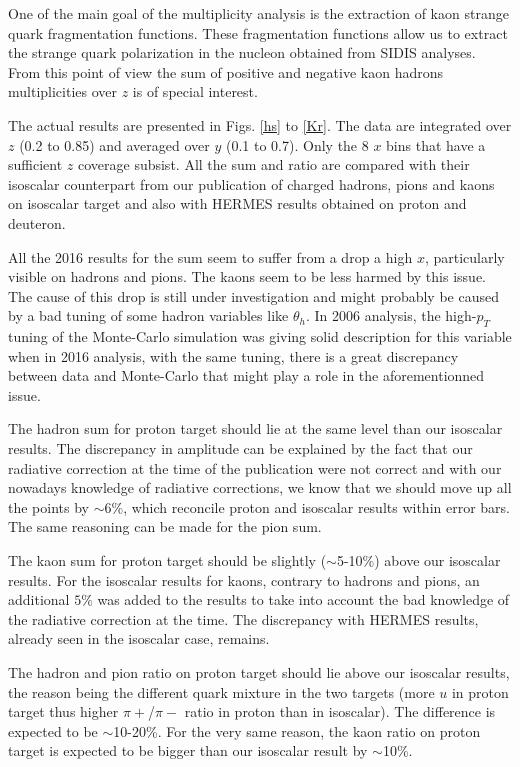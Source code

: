 \documentclass[letterpaper,12pt]{article}
\begin{document}
One of the main goal of the multiplicity analysis is the extraction of kaon strange quark fragmentation functions. These fragmentation functions allow us to extract the strange quark polarization in the nucleon obtained from SIDIS analyses. From this point of view the sum of positive and negative kaon hadrons multiplicities over $z$ is of special interest.

The actual results are presented in Figs. \ref{hs} to \ref{Kr}. The data are integrated over $z$ (0.2 to 0.85) and averaged over $y$ (0.1 to 0.7). Only the 8 $x$ bins that have a sufficient $z$ coverage subsist.
All the sum and ratio are compared with their isoscalar counterpart from our publication of charged hadrons, pions and kaons on isoscalar target and also with HERMES results obtained on proton and deuteron.

All the 2016 results for the sum seem to suffer from a drop a high $x$, particularly visible on hadrons and pions. The kaons seem to be less harmed by this issue. The cause of this drop is still under investigation and might probably be caused by a bad tuning of some hadron variables like $\theta_h$. In 2006 analysis, the high-$p_T$ tuning of the Monte-Carlo simulation was giving solid description for this variable when in 2016 analysis, with the same tuning, there is a great discrepancy between data and Monte-Carlo that might play a role in the aforementionned issue.

The hadron sum for proton target should lie at the same level than our isoscalar results. The discrepancy in amplitude can be explained by the fact that our radiative correction at the time of the publication were not correct and with our nowadays knowledge of radiative corrections, we know that we should move up all the points by $\sim$6\%, which reconcile proton and isoscalar results within error bars. The same reasoning can be made for the pion sum.

The kaon sum for proton target should be slightly ($\sim$5-10\%) above our isoscalar results. For the isoscalar results for kaons, contrary to hadrons and pions, an additional $5\%$ was added to the results to take into account the bad knowledge of the radiative correction at the time. The discrepancy with HERMES results, already seen in the isoscalar case, remains.

The hadron and pion ratio on proton target should lie above our isoscalar results, the reason being the different quark mixture in the two targets (more $u$ in proton target thus higher $\pi+$/$\pi-$ ratio in proton than in isoscalar). The difference is expected to be $\sim$10-20\%. For the very same reason, the kaon ratio on proton target is expected to be bigger than our isoscalar result by $\sim$10\%.
\end{document}
